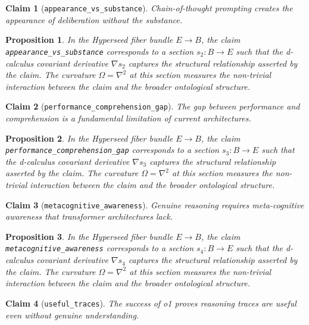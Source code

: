 \documentclass{article}
\newtheorem{claim}{Claim}
\newtheorem{proposition}{Proposition}
\begin{document}
\begin{claim}[\texttt{appearance_vs_substance}]
Chain-of-thought prompting creates the appearance of deliberation without the substance.
\end{claim}

\begin{proposition}
In the Hyperseed fiber bundle $E \to B$, the claim \texttt{appearance_vs_substance} corresponds to a section $s_2: B \to E$ such that the d-calculus covariant derivative $\nabla s_2$ captures the structural relationship asserted by the claim. The curvature $\Omega = \nabla^2$ at this section measures the non-trivial interaction between the claim and the broader ontological structure.
\end{proposition}

\begin{claim}[\texttt{performance_comprehension_gap}]
The gap between performance and comprehension is a fundamental limitation of current architectures.
\end{claim}

\begin{proposition}
In the Hyperseed fiber bundle $E \to B$, the claim \texttt{performance_comprehension_gap} corresponds to a section $s_3: B \to E$ such that the d-calculus covariant derivative $\nabla s_3$ captures the structural relationship asserted by the claim. The curvature $\Omega = \nabla^2$ at this section measures the non-trivial interaction between the claim and the broader ontological structure.
\end{proposition}

\begin{claim}[\texttt{metacognitive_awareness}]
Genuine reasoning requires meta-cognitive awareness that transformer architectures lack.
\end{claim}

\begin{proposition}
In the Hyperseed fiber bundle $E \to B$, the claim \texttt{metacognitive_awareness} corresponds to a section $s_4: B \to E$ such that the d-calculus covariant derivative $\nabla s_4$ captures the structural relationship asserted by the claim. The curvature $\Omega = \nabla^2$ at this section measures the non-trivial interaction between the claim and the broader ontological structure.
\end{proposition}

\begin{claim}[\texttt{useful_traces}]
The success of o1 proves reasoning traces are useful even without genuine understanding.
\end{claim}
\end{document}
